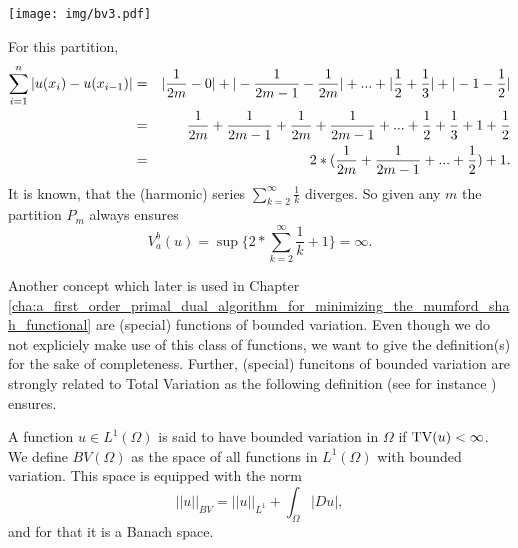 \begin{example}
\begin{enumerate}
                \begin{center}
                     \texttt{[image: img/bv3.pdf]}
                \end{center}
            For this partition,
                \begin{eqnarray}
                    \sum_{i = 1}^{n} |u(x_{i}) - u(x_{i-1})| &=& |\frac{1}{2m} - 0| + |-\frac{1}{2m-1} - \frac{1}{2m}| + ... + |\frac{1}{2} + \frac{1}{3}| + |-1 - \frac{1}{2}| \notag \\
                    &=& \frac{1}{2m} + \frac{1}{2m-1} + \frac{1}{2m} + \frac{1}{2m-1} + ... + \frac{1}{2} + \frac{1}{3} + 1 + \frac{1}{2} \notag \\
                    &=& 2*(\frac{1}{2m} + \frac{1}{2m-1} + ... + \frac{1}{2}) + 1. \notag
                \end{eqnarray}
            It is known, that the (harmonic) series $\sum_{k = 2}^{\infty} \frac{1}{k}$ diverges. So given any $m$ the partition $P_{m}$ always ensures
                $$
                    V^{b}_{a}(u) = \sup \{ 2 * \sum_{k = 2}^{\infty} \frac{1}{k} + 1 \} = \infty.
                $$
        \end{enumerate}

    \end{example}

    Another concept which later is used in Chapter \ref{cha:a_first_order_primal_dual_algorithm_for_minimizing_the_mumford_shah_functional}
    are (special) functions of bounded variation. Even though we do not expliciely make use of this class of functions, we want to give the definition(s) for the sake of completeness. Further, (special) funcitons of bounded variation are strongly related to Total Variation as the following definition (see for instance \cite{Giusti}) ensures.

    \begin{definition}
    \label{def:functions_of_bounded_variation}

        A function $u \in L^{1}(\Omega)$ is said to have bounded variation in $\Omega$ if $\textnormal{TV}(u) < \infty$. We define $BV(\Omega)$ as the space of all functions in $L^{1}(\Omega)$ with bounded variation. This space is equipped with the norm
            \begin{equation}
                ||u||_{BV} = ||u||_{L^{1}} + \int_{\Omega} |Du|,
            \end{equation}
        and for that it is a Banach space.
    
    \end{definition}

